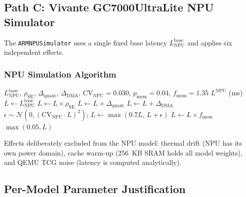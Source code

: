 \subsection{Path C: Vivante GC7000UltraLite NPU Simulator}
\label{sec:m2_npu_sim}

The \texttt{ARMNPUSimulator} uses a single fixed base latency
$L_{\text{NPU}}^{\text{base}}$ and applies six independent effects.

\subsubsection{NPU Simulation Algorithm}

\begin{algorithm}[H]
\caption{Vivante GC7000UltraLite NPU Latency Simulation
         (\texttt{ARMNPUSimulator.simulate()})}
\label{alg:m2_npu_sim}
\begin{algorithmic}[1]
\Require $L_{\text{NPU}}^{\text{base}}$, $\rho_{\text{SE}}$,
         $\Delta_{\text{quant}}$, $\Delta_{\text{DMA}}$,
         $\text{CV}_{\text{NPU}}=0.030$, $p_{\text{mem}}=0.04$,
         $f_{\text{mem}}=1.35$
\Ensure $L^{\text{NPU}}$ (ms)
\State $L\gets L_{\text{NPU}}^{\text{base}}$
\State $L\gets L\times\rho_{\text{SE}}$
\State $L\gets L+\Delta_{\text{quant}}$
\State $L\gets L+\Delta_{\text{DMA}}$
\State $\epsilon\sim\mathcal{N}(0,(\text{CV}_{\text{NPU}}\cdot L)^2)$;\quad
       $L\gets\max(0.7L,\,L+\epsilon)$
    \State $L\gets L\times f_{\text{mem}}$
\EndIf
\State\Return $\max(0.05,L)$
\end{algorithmic}
\end{algorithm}

Effects deliberately excluded from the NPU model: thermal drift (NPU has its
own power domain), cache warm-up (256~KB SRAM holds all model weights), and
QEMU TCG noise (latency is computed analytically).

\subsection{Per-Model Parameter Justification}

